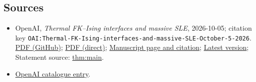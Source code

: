 \documentclass[11pt]{article}
\begin{document}
\subsection{Sources}
\begin{itemize}
\item OpenAI, \emph{Thermal FK–Ising interfaces and massive SLE}, 2026-10-05; citation key \texttt{OAI:Thermal-FK-Ising-interfaces-and-massive-SLE-October-5-2026}. \href{https://github.com/openai/math/blob/adc7f1241b42e322a6451854ab7e4b4c146bf78a/preprints/Thermal-FK-Ising-interfaces-and-massive-SLE-October-5-2026/paper.pdf}{PDF (GitHub)}; \href{https://github.com/openai/math/raw/adc7f1241b42e322a6451854ab7e4b4c146bf78a/preprints/Thermal-FK-Ising-interfaces-and-massive-SLE-October-5-2026/paper.pdf}{PDF (direct)}; \href{https://github.com/openai/math/blob/adc7f1241b42e322a6451854ab7e4b4c146bf78a/preprints/Thermal-FK-Ising-interfaces-and-massive-SLE-October-5-2026/README.md}{Manuscript page and citation}; \href{https://github.com/openai/math/blob/main/preprints/Thermal-FK-Ising-interfaces-and-massive-SLE-October-5-2026/paper.pdf}{Latest version}; Statement source: \href{https://github.com/openai/math/blob/adc7f1241b42e322a6451854ab7e4b4c146bf78a/preprints/Thermal-FK-Ising-interfaces-and-massive-SLE-October-5-2026/build/sections/model.tex\#L92}{thm:main}.
\item \href{https://github.com/openai/math/blob/adc7f1241b42e322a6451854ab7e4b4c146bf78a/CONTENTS.md}{OpenAI catalogue entry}.
\end{itemize}
\end{document}

